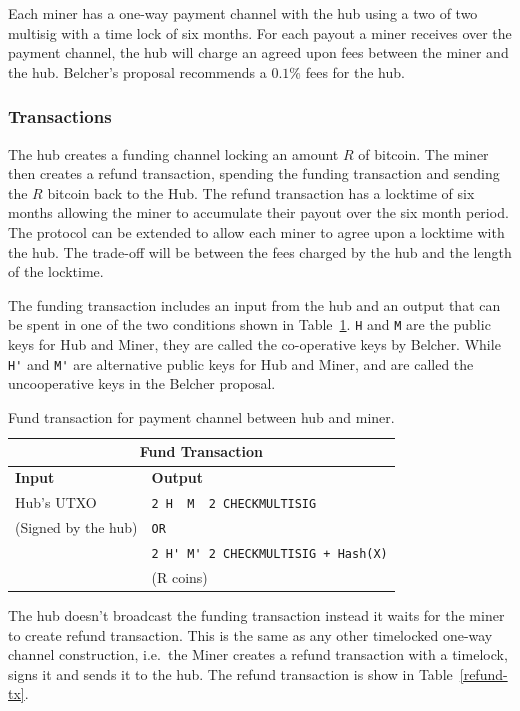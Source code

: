 \documentclass{article}
\begin{document}
Each miner has a one-way payment channel with the hub using a two of
two multisig with a time lock of six months. For each payout a miner
receives over the payment channel, the hub will charge an agreed upon
fees between the miner and the hub. Belcher's proposal recommends a
$0.1\%$ fees for the hub.

\subsubsection{Transactions}

The hub creates a funding channel locking an amount $R$ of
bitcoin. The miner then creates a refund transaction, spending the
funding transaction and sending the $R$ bitcoin back to the Hub. The
refund transaction has a locktime of six months allowing the miner to
accumulate their payout over the six month period. The protocol can be
extended to allow each miner to agree upon a locktime with the
hub. The trade-off will be between the fees charged by the hub and the
length of the locktime.

The funding transaction includes an input from the hub and an output
that can be spent in one of the two conditions shown in
Table~\ref{fund-tx}. \verb|H| and \verb|M| are the public keys for Hub
and Miner, they are called the co-operative keys by Belcher. While
\verb|H'| and \verb|M'| are alternative public keys for Hub and Miner,
and are called the uncooperative keys in the Belcher proposal.


\begin{table}
  \centering
  \begin{tabular}{ ll }
    \multicolumn{2}{c}{\bfseries Fund Transaction} \\
    \midrule
    \bfseries Input & \bfseries Output \\
    \midrule
    Hub's UTXO & \verb|2 H  M  2 CHECKMULTISIG| \\
    (Signed by the hub) & \verb|OR| \\
                    & \verb|2 H' M' 2 CHECKMULTISIG + Hash(X)| \\
    & (R coins) \\
    \midrule
  \end{tabular}
  \caption{Fund transaction for payment channel between hub and miner.}\label{fund-tx}
\end{table}


The hub doesn't broadcast the funding transaction instead it waits for
the miner to create refund transaction. This is the same as any other
timelocked one-way channel construction, i.e.\ the Miner creates a
refund transaction with a timelock, signs it and sends it to the
hub. The refund transaction is show in Table~\ref{refund-tx}.
\end{document}
